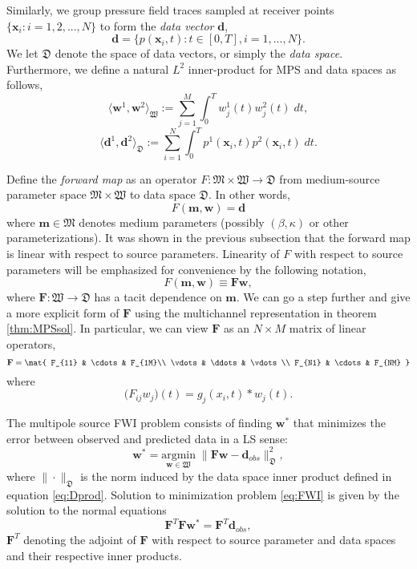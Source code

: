 Similarly, we group pressure field traces sampled at receiver points $\{\mathbf x_i : i=1,2,...,N\}$ to form the {\em data vector} $\mathbf d$,
\[
	\mathbf d = \{ p(\mathbf x_i,t) : t\in[0,T], i=1,...,N\}.
\]
We let $\mathfrak D$ denote the space of data vectors, or simply the {\em data space}.
Furthermore, we define a natural $L^2$ inner-product for MPS and data spaces as follows,
\begin{equation}\label{eq:Wprod}
	\langle \mathbf w^1,\mathbf w^2 \rangle_{\mathfrak W} := \sum_{j=1}^M \int_{0}^T w^1_j(t) w^2_j(t) \;dt,
\end{equation}
\begin{equation}\label{eq:Dprod}
	\langle \mathbf d^1,\mathbf d^2 \rangle_{\mathfrak D} := \sum_{i=1}^N \int_{0}^T p^1(\mathbf x_i,t) p^2(\mathbf x_i,t) \; dt.
\end{equation}


Define the \emph{forward map} as an operator $F:\mathfrak M\times \mathfrak W \to \mathfrak D$ from medium-source parameter space $\mathfrak M\times \mathfrak W$ to data space $\mathfrak D$.
In other words,
\[
	F(\mathbf m,\mathbf w) = \mathbf d
\]
where $\mathbf m\in\mathfrak M$ denotes medium parameters (possibly $(\beta, \kappa)$ or other parameterizations).
It was shown in the previous subsection that the forward map is linear with respect to source parameters.
Linearity of $F$ with respect to source parameters will be emphasized for convenience by the following notation,
\[
	F(\mathbf m,\mathbf w) \equiv \mathbf F \mathbf w,
\]
where $\mathbf F:\mathfrak W\to\mathfrak D$ has a tacit dependence on $\mathbf m$.
We can go a step further and give a more explicit form of $\mathbf F$ using the multichannel representation in theorem \ref{thm:MPSsol}.
In particular, we can view $\mathbf F$ as an $N\times M$ matrix of linear operators,
\[
	\mathbf F = \mat{  F_{11} & \cdots &  F_{1M}\\
				   \vdots & \ddots & \vdots \\
				    F_{N1} & \cdots &  F_{NM} }
\]
 where 
\[
	\mathbf (F_{ij} w_j)(t) = g_j(x_i,t)*w_j(t).
\]

The multipole source FWI problem consists of finding $\mathbf w^*$ that minimizes the error between observed and predicted data in a LS sense:
\begin{equation}\label{eq:FWI}
	\mathbf w^* = \underset{\mathbf w\in\mathfrak W}{\text{argmin}} \; \| \mathbf F \mathbf w - \mathbf d_{obs}\|^2_{\mathfrak D},
\end{equation}
where $\|\cdot\|_{\mathfrak D}$ is the norm induced by the data space inner product defined in equation \ref{eq:Dprod}.
Solution to minimization problem \ref{eq:FWI} is given by the solution to the normal equations
\begin{equation}\label{eq:NEQ}
	\mathbf F^T \mathbf F \mathbf w^* = \mathbf F^T \mathbf d_{obs},
\end{equation}
$\mathbf F^T$ denoting the adjoint of $\mathbf F$ with respect to source parameter and data spaces and their respective inner products.

